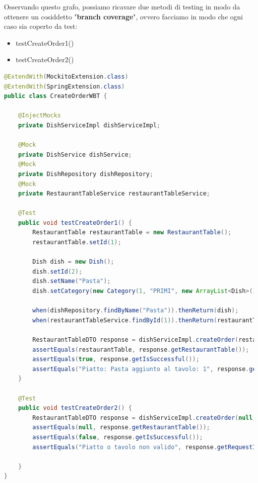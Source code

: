 Osservando questo grafo, possiamo ricavare due metodi di testing in modo da ottenere un cosiddetto "\textbf{branch coverage}", ovvero facciamo in modo che ogni caso sia coperto da test:
\begin{itemize}
    \item testCreateOrder1()
    \item testCreateOrder2()
\end{itemize}
\begin{lstlisting}[language=java]
@ExtendWith(MockitoExtension.class)
@ExtendWith(SpringExtension.class)
public class CreateOrderWBT {

    @InjectMocks
    private DishServiceImpl dishServiceImpl;

    @Mock
    private DishService dishService;
    @Mock
    private DishRepository dishRepository;
    @Mock
    private RestaurantTableService restaurantTableService;

    @Test
    public void testCreateOrder1() {
        RestaurantTable restaurantTable = new RestaurantTable();
        restaurantTable.setId(1);

        Dish dish = new Dish();
        dish.setId(2);
        dish.setName("Pasta");
        dish.setCategory(new Category(1, "PRIMI", new ArrayList<Dish>()));

        when(dishRepository.findByName("Pasta")).thenReturn(dish);
        when(restaurantTableService.findById(1)).thenReturn(restaurantTable);

        RestaurantTableDTO response = dishServiceImpl.createOrder(restaurantTable, dish);
        assertEquals(restaurantTable, response.getRestaurantTable());
        assertEquals(true, response.getIsSuccessful());
        assertEquals("Piatto: Pasta aggiunto al tavolo: 1", response.getRequestInfo());
    }

    @Test
    public void testCreateOrder2() {
        RestaurantTableDTO response = dishServiceImpl.createOrder(null, null);
        assertEquals(null, response.getRestaurantTable());
        assertEquals(false, response.getIsSuccessful());
        assertEquals("Piatto o tavolo non valido", response.getRequestInfo());

    }
}

\end{lstlisting}
